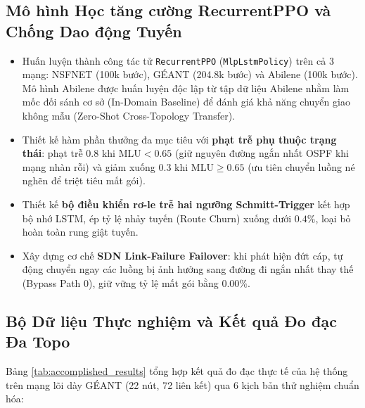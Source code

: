 \documentclass[11pt,a4paper]{article}
\begin{document}
\subsection{Mô hình Học tăng cường RecurrentPPO và Chống Dao động Tuyến}
\begin{itemize}
    \item Huấn luyện thành công tác tử \texttt{RecurrentPPO} (\texttt{MlpLstmPolicy}) trên cả 3 mạng: NSFNET (100k bước), GÉANT (204.8k bước) và Abilene (100k bước). Mô hình Abilene được huấn luyện độc lập từ tập dữ liệu Abilene nhằm làm mốc đối sánh cơ sở (In-Domain Baseline) để đánh giá khả năng chuyển giao không mẫu (Zero-Shot Cross-Topology Transfer).
    \item Thiết kế hàm phần thưởng đa mục tiêu với \textbf{phạt trễ phụ thuộc trạng thái}: phạt trễ $0.8$ khi $\text{MLU} < 0.65$ (giữ nguyên đường ngắn nhất OSPF khi mạng nhàn rỗi) và giảm xuống $0.3$ khi $\text{MLU} \ge 0.65$ (ưu tiên chuyển luồng né nghẽn để triệt tiêu mất gói).
    \item Thiết kế \textbf{bộ điều khiển rơ-le trễ hai ngưỡng Schmitt-Trigger} kết hợp bộ nhớ LSTM, ép tỷ lệ nhảy tuyến (Route Churn) xuống dưới $0.4\%$, loại bỏ hoàn toàn rung giật tuyến.
    \item Xây dựng cơ chế \textbf{SDN Link-Failure Failover}: khi phát hiện đứt cáp, tự động chuyển ngay các luồng bị ảnh hưởng sang đường đi ngắn nhất thay thế (Bypass Path 0), giữ vững tỷ lệ mất gói bằng $0.00\%$.
\end{itemize}

\subsection{Bộ Dữ liệu Thực nghiệm và Kết quả Đo đạc Đa Topo}
Bảng \ref{tab:accomplished_results} tổng hợp kết quả đo đạc thực tế của hệ thống trên mạng lõi dày GÉANT (22 nút, 72 liên kết) qua 6 kịch bản thử nghiệm chuẩn hóa:
\end{document}
